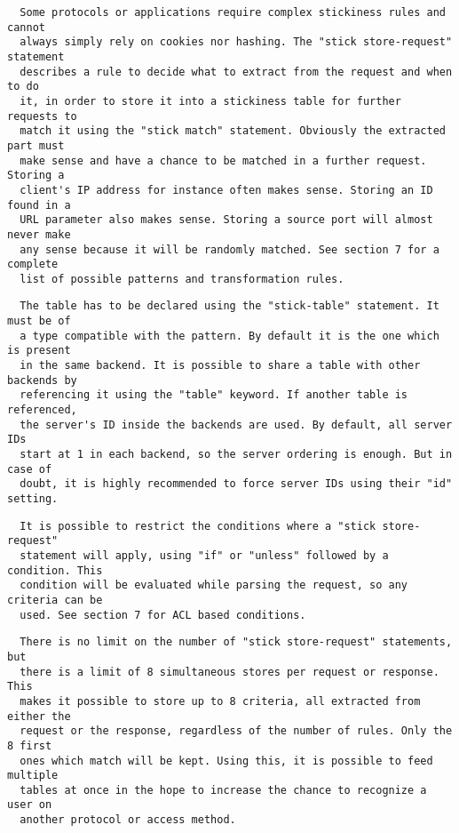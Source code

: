 \begin{verbatim}
  Some protocols or applications require complex stickiness rules and cannot
  always simply rely on cookies nor hashing. The "stick store-request" statement
  describes a rule to decide what to extract from the request and when to do
  it, in order to store it into a stickiness table for further requests to
  match it using the "stick match" statement. Obviously the extracted part must
  make sense and have a chance to be matched in a further request. Storing a
  client's IP address for instance often makes sense. Storing an ID found in a
  URL parameter also makes sense. Storing a source port will almost never make
  any sense because it will be randomly matched. See section 7 for a complete
  list of possible patterns and transformation rules.
\end{verbatim}

\begin{verbatim}
  The table has to be declared using the "stick-table" statement. It must be of
  a type compatible with the pattern. By default it is the one which is present
  in the same backend. It is possible to share a table with other backends by
  referencing it using the "table" keyword. If another table is referenced,
  the server's ID inside the backends are used. By default, all server IDs
  start at 1 in each backend, so the server ordering is enough. But in case of
  doubt, it is highly recommended to force server IDs using their "id" setting.
\end{verbatim}

\begin{verbatim}
  It is possible to restrict the conditions where a "stick store-request"
  statement will apply, using "if" or "unless" followed by a condition. This
  condition will be evaluated while parsing the request, so any criteria can be
  used. See section 7 for ACL based conditions.
\end{verbatim}

\begin{verbatim}
  There is no limit on the number of "stick store-request" statements, but
  there is a limit of 8 simultaneous stores per request or response. This
  makes it possible to store up to 8 criteria, all extracted from either the
  request or the response, regardless of the number of rules. Only the 8 first
  ones which match will be kept. Using this, it is possible to feed multiple
  tables at once in the hope to increase the chance to recognize a user on
  another protocol or access method.
\end{verbatim}

